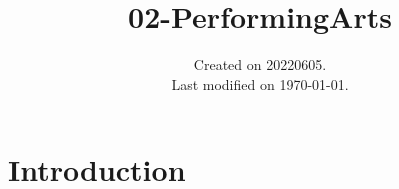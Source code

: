\documentclass[UTF8]{../RepresentationUniverse}
\begin{document}
\title{02-PerformingArts}
\date{Created on 20220605.\\   Last modified on \today.}
\maketitle
\tableofcontents


\chapter{Introduction}
\end{document}
